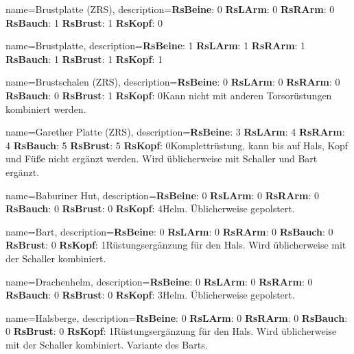 {
    name={Brustplatte (ZRS)},
    description={\textbf{RsBeine}: 0 \textbf{RsLArm}: 0 \textbf{RsRArm}: 0 \textbf{RsBauch}: 1 \textbf{RsBrust}: 1 \textbf{RsKopf}: 0\newline }
}


{
    name={Brustplatte},
    description={\textbf{RsBeine}: 1 \textbf{RsLArm}: 1 \textbf{RsRArm}: 1 \textbf{RsBauch}: 1 \textbf{RsBrust}: 1 \textbf{RsKopf}: 1\newline }
}


{
    name={Brustschalen (ZRS)},
    description={\textbf{RsBeine}: 0 \textbf{RsLArm}: 0 \textbf{RsRArm}: 0 \textbf{RsBauch}: 0 \textbf{RsBrust}: 1 \textbf{RsKopf}: 0\newline Kann nicht mit anderen Torsorüstungen kombiniert werden.}
}


{
    name={Garether Platte (ZRS)},
    description={\textbf{RsBeine}: 3 \textbf{RsLArm}: 4 \textbf{RsRArm}: 4 \textbf{RsBauch}: 5 \textbf{RsBrust}: 5 \textbf{RsKopf}: 0\newline Komplettrüstung, kann bis auf Hals, Kopf und Füße nicht ergänzt werden. Wird üblicherweise mit Schaller und Bart ergänzt.}
}


{
    name={Baburiner Hut},
    description={\textbf{RsBeine}: 0 \textbf{RsLArm}: 0 \textbf{RsRArm}: 0 \textbf{RsBauch}: 0 \textbf{RsBrust}: 0 \textbf{RsKopf}: 4\newline Helm. Üblicherweise gepolstert.}
}


{
    name={Bart},
    description={\textbf{RsBeine}: 0 \textbf{RsLArm}: 0 \textbf{RsRArm}: 0 \textbf{RsBauch}: 0 \textbf{RsBrust}: 0 \textbf{RsKopf}: 1\newline Rüstungsergänzung für den Hals. Wird üblicherweise mit der Schaller kombiniert.}
}


{
    name={Drachenhelm},
    description={\textbf{RsBeine}: 0 \textbf{RsLArm}: 0 \textbf{RsRArm}: 0 \textbf{RsBauch}: 0 \textbf{RsBrust}: 0 \textbf{RsKopf}: 3\newline Helm. Üblicherweise gepolstert.}
}


{
    name={Halsberge},
    description={\textbf{RsBeine}: 0 \textbf{RsLArm}: 0 \textbf{RsRArm}: 0 \textbf{RsBauch}: 0 \textbf{RsBrust}: 0 \textbf{RsKopf}: 1\newline Rüstungsergänzung für den Hals. Wird üblicherweise mit der Schaller kombiniert. Variante des Barts.}
}


